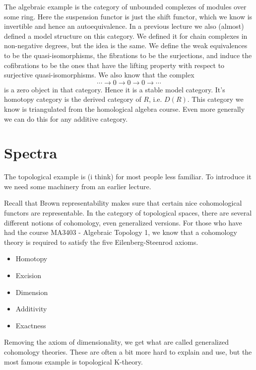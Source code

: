 The algebraic example is the category of unbounded complexes of modules over some ring. 
Here the suspension functor is just the shift functor, 
which we know is invertible and hence an autoequivalence. 
In a previous lecture we also (almost) defined a model structure on this category. 
We defined it for chain complexes in non-negative degrees, 
but the idea is the same. We define the weak equivalences to be the quasi-isomorphisms, 
the fibrations to be the surjections, 
and induce the cofibrations to be the ones that have the lifting property with respect to surjective quasi-isomorphisms. 
We also know that the complex 
\begin{equation*}
    \cdots \longrightarrow 0 \longrightarrow 0 \longrightarrow 0 \longrightarrow \cdots 
\end{equation*}
is a zero object in that category. 
Hence it is a stable model category. 
It's homotopy category is the derived category of $R$, 
i.e. $D(R)$. 
This category we know is triangulated from the homological algebra course. 
Even more generally we can do this for any additive category. 

\section{Spectra}

The topological example is (i think) for most people less familiar. 
To introduce it we need some machinery from an earlier lecture. 

Recall that Brown representability makes sure that certain nice cohomological functors are representable. 
In the category of topological spaces, 
there are several different notions of cohomology, 
even generalized versions. 
For those who have had the course MA3403 - Algebraic Topology 1, 
we know that a cohomology theory is required to satisfy the five Eilenberg-Steenrod axioms. 
\begin{itemize}
    \item Homotopy
    \item Excision
    \item Dimension
    \item Additivity
    \item Exactness
\end{itemize}

Removing the axiom of dimensionality, 
we get what are called generalized cohomology theories. 
These are often a bit more hard to explain and use, 
but the most famous example is topological K-theory.

